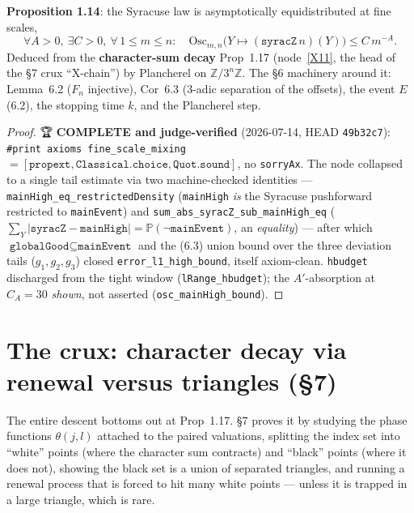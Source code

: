 \begin{proposition}\label{C10}
  \leanok
\textbf{Proposition 1.14}: the Syracuse law is asymptotically equidistributed at fine scales,
\[
  \forall A>0,\ \exists C>0,\ \forall\, 1\le m\le n:\quad
  \mathrm{Osc}_{m,n}\bigl(Y\mapsto (\texttt{syracZ}\,n)(Y)\bigr) \le C\,m^{-A}.
\]
Deduced from the \textbf{character-sum decay} Prop~1.17 (node~\ref{X11}, the head of the §7
crux ``X-chain'') by Plancherel on \(\mathbb{Z}/3^n\mathbb{Z}\).  The §6 machinery around it:
Lemma~6.2 (\(F_n\) injective), Cor~6.3 (\(3\)-adic separation of the offsets), the event \(E\)
(6.2), the stopping time \(k\), and the Plancherel step.
\end{proposition}
\begin{proof}
  \leanok
  🏆 \textbf{COMPLETE and judge-verified} (2026-07-14, HEAD \texttt{49b32c7}):
  \texttt{\#print axioms fine\_scale\_mixing} \(= [\texttt{propext}, \texttt{Classical.choice},
  \texttt{Quot.sound}]\), no \texttt{sorryAx}.  The node collapsed to a single tail estimate via two
  machine-checked identities — \texttt{mainHigh\_eq\_restrictedDensity} (\texttt{mainHigh} \emph{is}
  the Syracuse pushforward restricted to \texttt{mainEvent}) and
  \texttt{sum\_abs\_syracZ\_sub\_mainHigh\_eq} (\(\sum_Y|\texttt{syracZ}-\texttt{mainHigh}| =
  \mathbb{P}(\neg\texttt{mainEvent})\), an \emph{equality}) — after which \(\texttt{globalGood}
  \subseteq \texttt{mainEvent}\) and the (6.3) union bound over the three deviation tails
  (\(g_1,g_2,g_3\)) closed \texttt{error\_l1\_high\_bound}, itself axiom-clean.  \texttt{hbudget}
  discharged from the tight window (\texttt{lRange\_hbudget}); the \(A'\)-absorption at \(C_A=30\)
  \emph{shown}, not asserted (\texttt{osc\_mainHigh\_bound}).
\end{proof}


\chapter{The crux: character decay via renewal versus triangles (§7)}\label{chp:crux}

The entire descent bottoms out at Prop~1.17.  §7 proves it by studying the phase functions
\(\theta(j,l)\) attached to the paired valuations, splitting the index set into ``white''
points (where the character sum contracts) and ``black'' points (where it does not), showing
the black set is a union of separated triangles, and running a renewal process that is forced
to hit many white points --- unless it is trapped in a large triangle, which is rare.

